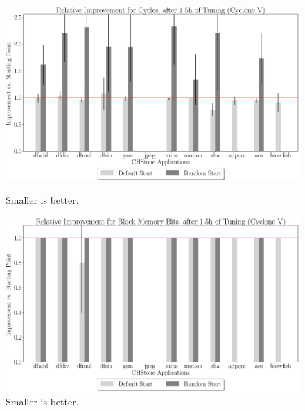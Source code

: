 \documentclass[12pt, a4paper]{article}
\begin{document}
\begin{figure}[htpb]
    \begin{minipage}{.48\textwidth}
        \centering
        \includegraphics[width=.8\textwidth]{rel_comp_cycles_5400_chstone_CycloneV}
        \caption{Smaller is better.}
    \end{minipage}%
    \begin{minipage}{.48\textwidth}
        \centering
        \includegraphics[width=.8\textwidth]{rel_comp_block_5400_chstone_CycloneV}
        \caption{Smaller is better.}
    \end{minipage}%
\end{figure}
\end{document}
